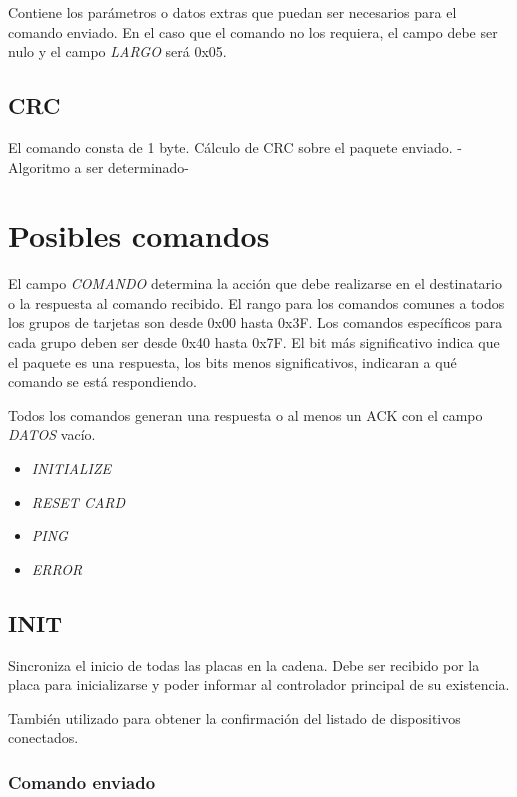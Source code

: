 \documentclass[a4paper,10pt]{article}
\begin{document}
	Contiene los par\'ametros o datos extras que puedan ser necesarios para el comando enviado.
	En el caso que el comando no los requiera, el campo debe ser nulo y el campo \emph{LARGO} ser\'a 0x05.

\subsection{CRC}
\label{crc}

	El comando consta de 1 byte.
	C\'alculo de CRC sobre el paquete enviado.
	-Algoritmo a ser determinado-

\section{Posibles comandos}
\label{comandos}

El campo \emph{COMANDO} determina la acci\'on que debe realizarse en el destinatario o la respuesta al comando recibido.
El rango para los comandos comunes a todos los grupos de tarjetas son desde 0x00 hasta 0x3F.
Los comandos espec\'ificos para cada grupo deben ser desde 0x40 hasta 0x7F.
El bit m\'as significativo indica que el paquete es una respuesta, los bits menos significativos, indicaran a qu\'e comando se est\'a respondiendo.

Todos los comandos generan una respuesta o al menos un ACK con el campo \emph{DATOS} vac\'io.

\begin{itemize}
	\item \emph{INITIALIZE}
	\item \emph{RESET CARD}
	\item \emph{PING}
	\item \emph{ERROR}
\label{lista_comandos}
\end{itemize}

\subsection{INIT}
\label{init}

Sincroniza el inicio de todas las placas en la cadena.
Debe ser recibido por la placa para inicializarse y poder informar al controlador principal de su existencia.

Tambi\'en utilizado para obtener la confirmaci\'on del listado de dispositivos conectados.

\subsubsection*{Comando enviado}
\label{init_comando_enviado}
\end{document}
